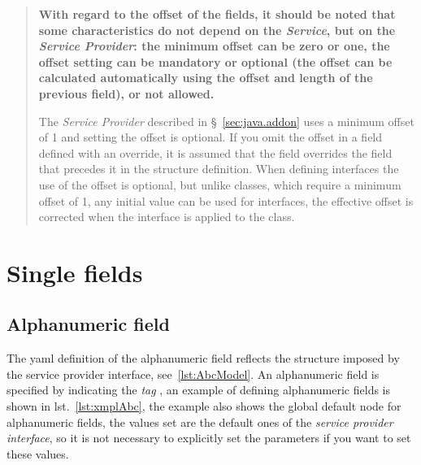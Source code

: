 \documentclass[a4paper,10pt]{report}
\begin{document}
\begin{quote}\small\bf
With regard to the offset of the fields, it should be noted that some 
characteristics do not depend on the \textsl{Service}, but on the 
\textsl{Service Provider}: the minimum offset can be zero or one, the offset 
setting can be mandatory or optional (the offset can be calculated automatically 
using the offset and length of the previous field), or not allowed.

The \textsl{Service Provider} described in \S~\ref{sec:java.addon} uses a 
minimum offset of 1 and setting the offset is optional. If you omit the offset 
in a field defined with an override, it is assumed that the field overrides the 
field that precedes it in the structure definition. 
When defining interfaces the use of the offset is optional, but unlike classes, 
which require a minimum offset of 1, any initial value can be used for 
interfaces, the effective offset is corrected when the interface is applied to 
the class.
\end{quote}

\section{Single fields}

\subsection{Alphanumeric field} \label{sub:yaml.abc}
The yaml definition of the alphanumeric field reflects the structure imposed by 
the service provider interface, see~\ref{lst:AbcModel}. 
An alphanumeric field is specified by indicating the 
 \textsl{tag} , an example of 
defining alphanumeric fields is shown in lst.~\ref{lst:xmplAbc}, the example 
also shows the global default node for alphanumeric fields, the values set are 
the default ones of the \textsl{service provider interface}, so it is not 
necessary to explicitly set the parameters if you want to set these values.
\end{document}
